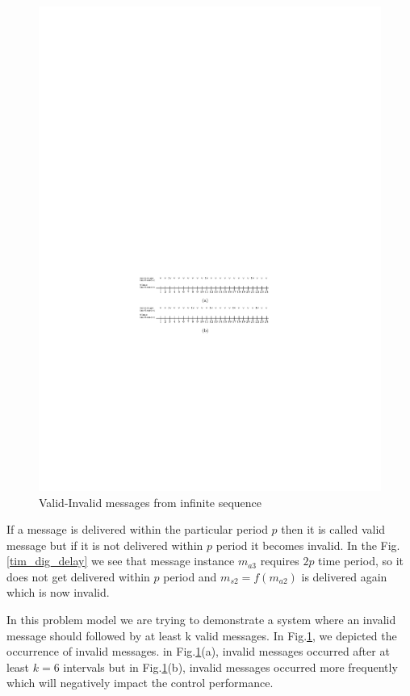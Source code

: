 \begin{figure}
\begin{center}
\includegraphics[width = 120mm]{valid_invalid.pdf}
\end{center}
\caption{Valid-Invalid messages from infinite sequence}
\label{tim_dig_cons}
\end{figure}


If a message is delivered within the particular period $p$ then it is called valid message but
if it is not delivered within $p$ period it becomes invalid. In the Fig.\ref{tim_dig_delay} we see that message
instance $m_{a3}$ requires $2p$ time period, so it does not get delivered within $p$ period and 
$m_{s2} = f(m_{a2})$ is delivered again which is now invalid.

In this problem model we are trying to demonstrate a system where an invalid message should 
followed by at least k valid messages. In Fig.\ref{tim_dig_cons}, we depicted the occurrence of invalid messages.
in Fig.\ref{tim_dig_cons}(a), invalid messages occurred after at least $k=6$ intervals but 
in Fig.\ref{tim_dig_cons}(b), invalid
messages occurred more frequently which will negatively impact the control performance.






